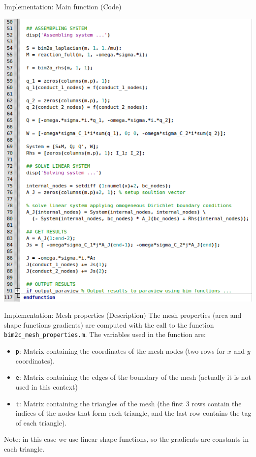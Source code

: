 \documentclass[aspectratio=54,xcolor=dvipsnames]{beamer}
\begin{document}
\begin{frame}{Implementation: Main function (Code)}
\begin{center}
\begin{minipage}{0.49\textwidth}
            \includegraphics[width=\textwidth]{Images/Main_code2.png}
        \end{minipage}
    \end{center}
\end{frame}

\begin{frame}{Implementation: Mesh properties (Description)}
    The mesh properties (area and shape functions gradients) are computed with the call to the function \texttt{bim2c\_mesh\_properties.m}. 
    The variables used in the function are:
    \begin{itemize}
        \item \texttt{p}: Matrix containing the coordinates of the mesh nodes (two rows for $x$ and $y$ coordinates).
        \item \texttt{e}: Matrix containing the edges of the boundary of the mesh (actually it is not used in this context)
        \item \texttt{t}: Matrix containing the triangles of the mesh (the first 3 rows contain the indices of the nodes that form each triangle, and the last row contains the tag of each triangle).
    \end{itemize}
    Note: in this case we use linear shape functions, so the gradients are constants in each triangle.
\end{frame}
\end{document}
